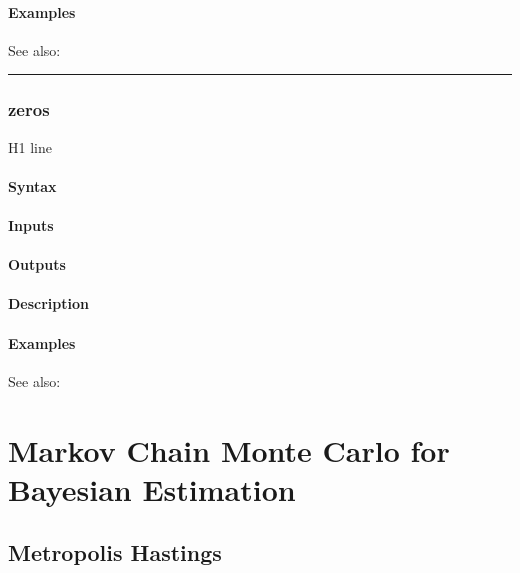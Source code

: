 \documentclass[letterpaper,10pt,english]{sphinxmanual}
\begin{document}
\subsubsection{Examples}
\label{classes/time_series/@ts/ts:id587}
See also:


\bigskip\hrule{}\bigskip



\subsection{zeros}
\label{classes/time_series/@ts/ts:zeros}\label{classes/time_series/@ts/ts:id588}
H1 line


\subsubsection{Syntax}
\label{classes/time_series/@ts/ts:id589}

\subsubsection{Inputs}
\label{classes/time_series/@ts/ts:id590}

\subsubsection{Outputs}
\label{classes/time_series/@ts/ts:id591}

\subsubsection{Description}
\label{classes/time_series/@ts/ts:id592}

\subsubsection{Examples}
\label{classes/time_series/@ts/ts:id593}
See also:


\chapter{Markov Chain Monte Carlo for Bayesian Estimation}
\label{mcmc::doc}\label{mcmc:markov-chain-monte-carlo-for-bayesian-estimation}

\section{Metropolis Hastings}
\label{mcmc:metropolis-hastings}
\end{document}
